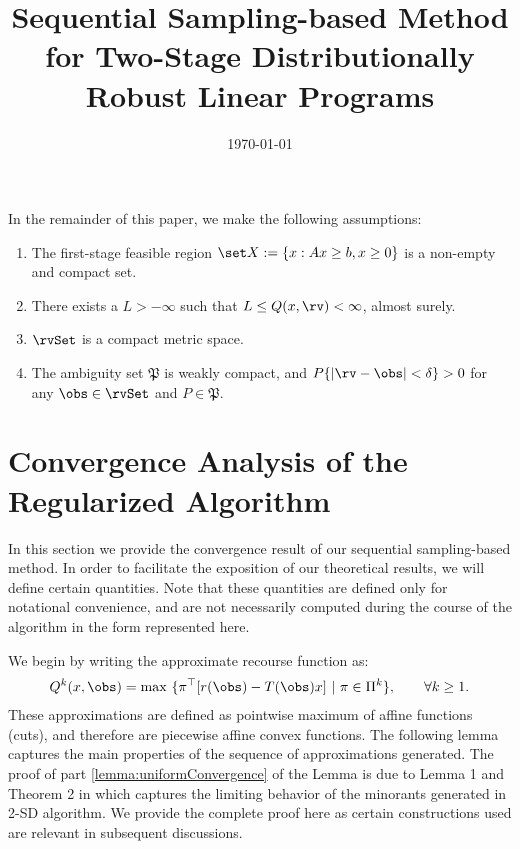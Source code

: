 \documentclass[11pt]{article}
\title{Sequential Sampling-based Method for Two-Stage Distributionally Robust Linear Programs}
\date{\today}
\author{}
\newcommand{\frakP}{\mathfrak{P}}
\begin{document}
\maketitle
In the remainder of this paper, we make the following assumptions:
\begin{enumerate}[label=(A\arabic{enumi})]
    \item The first-stage feasible region $\set X:= \{x: Ax \geq b, x \geq 0\}$ is a non-empty and compact set. \label{assum:compactX}
    \item There exists a $L > -\infty$ such that $L \leq Q(x,\rv) < \infty$, almost surely. \label{assum:completeRecourse}
    \item $\rvSet$ is a compact metric space. \label{assum:compactRV}
    \item The ambiguity set $\frakP$ is weakly compact, and $P\{|\rv - \obs| < \delta\} > 0$ for any $\obs \in \rvSet$ and $P \in \frakP$. \label{assum:compactAmb}
\end{enumerate}

\section{Convergence Analysis of the Regularized Algorithm}
In this section we provide the convergence result of our sequential sampling-based method. In order to facilitate the exposition of our theoretical results, we will define certain quantities. Note that these quantities are defined only for notational convenience, and are not necessarily computed during the course of the algorithm in the form represented here.

We begin by writing the approximate recourse function as:
\begin{align}
    Q^k(x,\obs) = \max~\{\pi^\top [r(\obs) - T(\obs)x]~|~ \pi \in \Pi^k\}, \qquad \forall k \geq 1.
\end{align}
These approximations are defined as pointwise maximum of affine functions (cuts), and therefore are piecewise affine convex functions. The following lemma captures the main properties of the sequence of approximations generated. The proof of part \ref{lemma:uniformConvergence} of the Lemma is due to Lemma 1 and Theorem 2 in \cite{Higle1991} which captures the limiting behavior of the minorants generated in 2-SD algorithm. We provide the complete proof here as certain constructions used are relevant in subsequent discussions.
\end{document}
